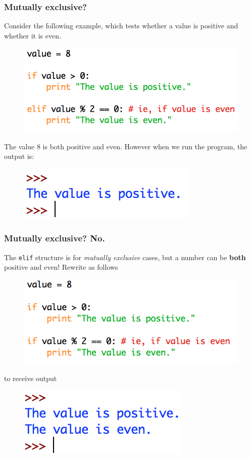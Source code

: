 \documentclass{beamer}
\begin{document}
\begin{frame}[fragile]
\frametitle{Mutually exclusive?}

Consider the following example, which tests whether a value is positive and whether it is even.
\begin{figure}
\centering
\includegraphics[scale=0.6]{IMG/ex.png}
\end{figure}

The value $8$ is both positive and even. However when we run the program, the output is:
\begin{figure}
\centering
\includegraphics[scale=0.6]{IMG/ex_out.png}
\end{figure}
\end{frame}

\begin{frame}[fragile]
\frametitle{Mutually exclusive? No.}

The \verb|elif| structure is for \emph{mutually exclusive} cases, but a number can be \textbf{both} positive and even! Rewrite as follows
\begin{figure}
\centering
\includegraphics[scale=0.6]{IMG/ex2.png}
\end{figure}
to receive output
\begin{figure}
\centering
\includegraphics[scale=0.6]{IMG/ex2_out.png}
\end{figure}
\end{frame}
\end{document}
